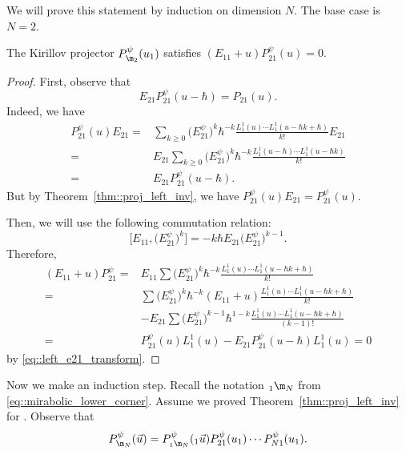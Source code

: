 	We will prove this statement by induction on dimension $N$. The base case is $N=2$.
	
	\begin{Proposition}
		\label{prop::proj_left_inv_gl2}
		The Kirillov projector $P_{\m_2}^{\psi}(u_1)$ satisfies
	$
			(E_{11} + u) P_{21}^{\psi}(u) = 0$.
		\begin{proof}
			First, observe that
			\begin{equation}
				\label{eq::left_e21_transform}
				E_{21} P^{\psi}_{21}(u-\hbar) = P_{21}(u).
			\end{equation}
			Indeed, we have
			\begin{align*}
				P_{21}^{\psi}(u) E_{21} ={}& \sum\limits_{k\geq 0} \bigl(E_{21}^{\psi}\bigr)^k \hbar^{-k} \frac{L_1^1(u) \cdots L_1^1(u-\hbar k+\hbar)}{k!} E_{21} \\
				= {}& E_{21} \sum\limits_{k\geq 0} \bigl(E_{21}^{\psi}\bigr)^k \hbar^{-k} \frac{L_1^1(u-\hbar) \cdots L_1^1(u-\hbar k)}{k!} \\
				= {}& E_{21} P_{21}^{\psi}(u-\hbar).
			\end{align*}
			But by Theorem~\ref{thm::proj_left_inv}, we have $P_{21}^{\psi}(u)E_{21} = P_{21}^{\psi}(u)$.
			
			Then, we will use the following commutation relation:
			\[
			\bigl[E_{11},\bigl(E_{21}^{\psi}\bigr)^k\bigr] = -k\hbar E_{21} \bigl(E_{21}^{\psi}\bigr)^{k-1}.
			\]
			Therefore,
			\begin{align*}
				(E_{11}+u) P_{21}^{\psi} = {}& E_{11} \sum \bigl(E_{21}^{\psi}\bigr)^k \hbar^{-k} \frac{L_1^1(u) \cdots L_1^1(u-\hbar k+\hbar)}{k!} \\
				={}& \sum \bigl(E_{21}^{\psi}\bigr)^k \hbar^{-k} (E_{11}+u) \frac{L_1^1(u) \cdots L_1^1(u-\hbar k+\hbar)}{k!} \\
				&- E_{21} \sum \bigl(E_{21}^{\psi}\bigr)^{k-1} \hbar^{1-k} \frac{L_1^1(u) \cdots L_1^1(u-\hbar k+\hbar)}{(k-1)!} \\
				={}& P_{21}^{\psi}(u) L_1^1(u) - E_{21} P_{21}^{\psi}(u-\hbar) L_1^1(u) = 0
			\end{align*}
			by \eqref{eq::left_e21_transform}.
		\end{proof}
	\end{Proposition}
	
	
	Now we make an induction step. Recall the notation ${}_1\m_{N}$ from \eqref{eq::mirabolic_lower_corner}. Assume we proved Theorem~\ref{thm::proj_left_inv} for . Observe that
	\[
	P_{\m_N}^{\psi}(\vec{u}) = P_{{}_1\m_{N}}^{\psi}({}_1\vec{u}) P_{21}^{\psi}(u_1) \cdots P_{N1}^{\psi}(u_1).
	\]
	
